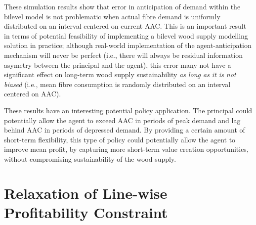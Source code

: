 These simulation results show that error in anticipation of demand within the bilevel model is not problematic when actual fibre demand is uniformly distributed on an interval centered on current AAC. This is an important result in terms of potential feasibility of implementing a bilevel wood supply modelling solution in practice; although real-world implementation of the agent-anticipation mechanism will never be perfect (i.e., there will always be residual information asymetry between the principal and the agent), this error many not have a significant effect on long-term wood supply sustainability \emph{as long as it is not biased} (i.e., mean fibre consumption is randomly distributed on an interval centered on AAC).  

These results have an interesting potential policy application. The principal could potentially allow the agent to exceed AAC in periods of peak demand and lag behind AAC in periods of depressed demand. By providing a certain amount of short-term flexibility, this type of policy could potentially allow the agent to improve mean profit, by capturing more short-term value creation opportunities, without compromising sustainability of the wood supply.

\section{Relaxation of Line-wise Profitability Constraint}
\label{sec:scenario_series_0}




